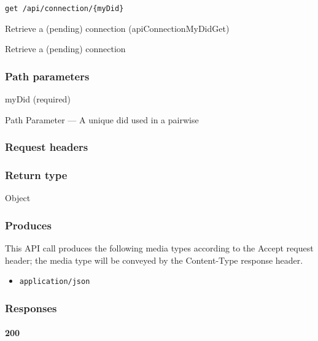 \protect\hypertarget{apiConnectionMyDidGet}{}{}

\begin{verbatim}
get /api/connection/{myDid}
\end{verbatim}

Retrieve a (pending) connection ({apiConnectionMyDidGet})

Retrieve a (pending) connection

\hypertarget{path-parameters-24}{%
\subsubsection{Path parameters}\label{path-parameters-24}}

myDid (required)

{Path Parameter} --- A unique did used in a pairwise

\hypertarget{request-headers-24}{%
\subsubsection{Request headers}\label{request-headers-24}}

\hypertarget{return-type-38}{%
\subsubsection{Return type}\label{return-type-38}}

Object

\hypertarget{produces-47}{%
\subsubsection{Produces}\label{produces-47}}

This API call produces the following media types according to the
{Accept} request header; the media type will be conveyed by the
{Content-Type} response header.

\begin{itemize}
\tightlist
\item
  \texttt{application/json}
\end{itemize}

\hypertarget{responses-47}{%
\subsubsection{Responses}\label{responses-47}}

\hypertarget{section-155}{%
\paragraph{200}\label{section-155}}

